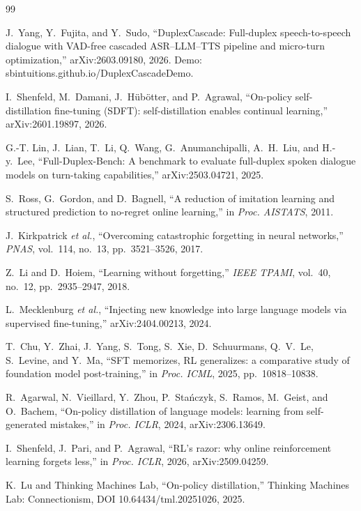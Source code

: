 \documentclass[conference]{IEEEtran}
\begin{document}
\begin{thebibliography}{99}

J.~Yang, Y.~Fujita, and Y.~Sudo,
``DuplexCascade: Full-duplex speech-to-speech dialogue with VAD-free cascaded
ASR--LLM--TTS pipeline and micro-turn optimization,'' arXiv:2603.09180, 2026.
Demo: sbintuitions.github.io/DuplexCascadeDemo.

I.~Shenfeld, M.~Damani, J.~H{\"u}b{\"o}tter, and P.~Agrawal,
``On-policy self-distillation fine-tuning (SDFT): self-distillation enables
continual learning,'' arXiv:2601.19897, 2026.

G.-T. Lin, J.~Lian, T.~Li, Q.~Wang, G.~Anumanchipalli, A.~H.~Liu, and H.-y.~Lee,
``Full-Duplex-Bench: A benchmark to evaluate full-duplex spoken dialogue models on
turn-taking capabilities,'' arXiv:2503.04721, 2025.

S.~Ross, G.~Gordon, and D.~Bagnell,
``A reduction of imitation learning and structured prediction to no-regret online
learning,'' in \emph{Proc. AISTATS}, 2011.

J.~Kirkpatrick \emph{et al.},
``Overcoming catastrophic forgetting in neural networks,'' \emph{PNAS},
vol.~114, no.~13, pp.~3521--3526, 2017.

Z.~Li and D.~Hoiem,
``Learning without forgetting,'' \emph{IEEE TPAMI}, vol.~40, no.~12,
pp.~2935--2947, 2018.

L.~Mecklenburg \emph{et al.},
``Injecting new knowledge into large language models via supervised fine-tuning,''
arXiv:2404.00213, 2024.

T.~Chu, Y.~Zhai, J.~Yang, S.~Tong, S.~Xie, D.~Schuurmans, Q.~V.~Le, S.~Levine, and
Y.~Ma,
``SFT memorizes, RL generalizes: a comparative study of foundation model
post-training,'' in \emph{Proc. ICML}, 2025, pp.~10818--10838.

R.~Agarwal, N.~Vieillard, Y.~Zhou, P.~Sta{\'n}czyk, S.~Ramos, M.~Geist, and
O.~Bachem,
``On-policy distillation of language models: learning from self-generated
mistakes,'' in \emph{Proc. ICLR}, 2024, arXiv:2306.13649.

I.~Shenfeld, J.~Pari, and P.~Agrawal,
``RL's razor: why online reinforcement learning forgets less,''
in \emph{Proc. ICLR}, 2026, arXiv:2509.04259.

K.~Lu and Thinking Machines Lab,
``On-policy distillation,'' Thinking Machines Lab: Connectionism,
DOI 10.64434/tml.20251026, 2025.


\end{thebibliography}
\end{document}
